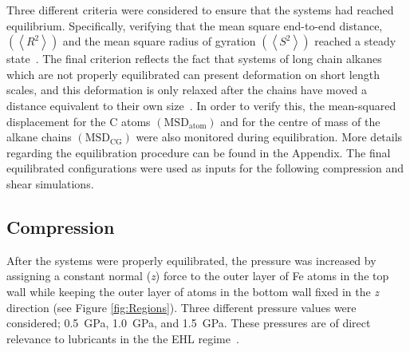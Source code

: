 \documentclass[5p]{elsarticle}
\begin{document}
Three different criteria were considered to ensure that the systems had reached equilibrium. Specifically, verifying that the mean square end-to-end distance, $\left(\left< R^2 \right> \right)$ and the mean square radius of gyration $\left(\left< S^2 \right> \right)$ reached a steady state~\cite{Brown1994}. The final criterion reflects the fact that systems of long chain alkanes which are not properly equilibrated can present deformation on short  length scales, and this deformation is only relaxed after the chains have moved a distance equivalent to their own size~\cite{Auhl2003}. In order to verify this, the mean-squared displacement for the C atoms $\left(\text{MSD}_{\text{atom}}\right)$ and for the centre of mass of the alkane chains $\left(\text{MSD}_{\text{CG}}\right)$ were also monitored during equilibration. More details regarding the equilibration procedure can be found in the Appendix. The final equilibrated configurations were used as inputs for the following compression and shear simulations. 

\subsection{Compression}

After the systems were properly equilibrated, the pressure was increased by assigning a constant normal (\emph{z}) force to the outer layer of Fe atoms in the top wall while keeping the outer layer of atoms in the bottom wall fixed in the \emph{z} direction (see Figure \ref{fig:Regions}). Three different pressure values were considered; \SI{0.5}{\giga\pascal}, \SI{1.0}{\giga\pascal}, and \SI{1.5}{\giga\pascal}. These pressures are of direct relevance to lubricants in the the EHL regime~\cite{Spikes2014}.
\end{document}
